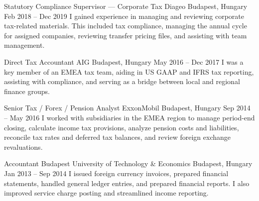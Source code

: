 \begin{cventries}
  \cventry
    {Statutory Compliance Supervisor — Corporate Tax} %
    {Diageo} %
    {Budapest, Hungary} %
    {Feb 2018 -- Dec 2019} %
    {I gained experience in managing and reviewing corporate tax-related materials. This included tax compliance, managing the annual cycle for assigned companies, reviewing transfer pricing files, and assisting with team management.} %
    {} %


  \cventry
    {Direct Tax Accountant} %
    {AIG} %
    {Budapest, Hungary} %
    {May 2016 -- Dec 2017} %
    {I was a key member of an EMEA tax team, aiding in US GAAP and IFRS tax reporting, assisting with compliance, and serving as a bridge between local and regional finance groups.} %
    {} %


  \cventry
    {Senior Tax / Forex / Pension Analyst} %
    {ExxonMobil} %
    {Budapest, Hungary} %
    {Sep 2014 -- May 2016} %
    {I worked with subsidiaries in the EMEA region to manage period-end closing, calculate income tax provisions, analyze pension costs and liabilities, reconcile tax rates and deferred tax balances, and review foreign exchange revaluations.} %
    {} %


  \cventry
    {Accountant} %
    {Budapest University of Technology \& Economics} %
    {Budapest, Hungary} %
    {Jan 2013 -- Sep 2014} %
    {I issued foreign currency invoices, prepared financial statements, handled general ledger entries, and prepared financial reports. I also improved service charge posting and streamlined income reporting.} %
    {} %


\end{cventries}
